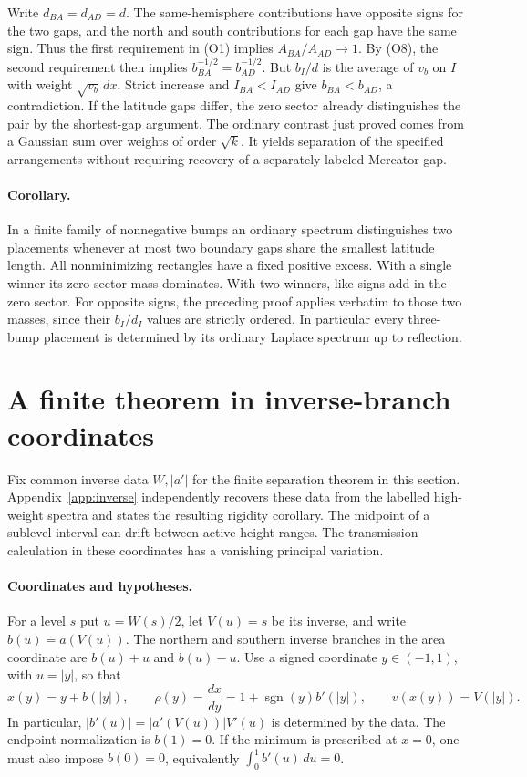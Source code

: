 \documentclass[11pt,letterpaper]{article}
\begin{document}
Write \(d_{BA}=d_{AD}=d\). The same-hemisphere contributions have
opposite signs for the two gaps, and the north and south contributions
for each gap have the same sign. Thus the first requirement in (O1)
implies \(A_{BA}/A_{AD}\to1\). By (O8), the second requirement then
implies \(b_{BA}^{-1/2}=b_{AD}^{-1/2}\). But \(b_I/d\) is the average
of \(v_b\) on \(I\) with weight \(\sqrt{v_b}\,dx\).
Strict increase and \(I_{BA}<I_{AD}\) give \(b_{BA}<b_{AD}\), a
contradiction. If the latitude gaps differ, the zero sector already
distinguishes the pair by the shortest-gap argument. The ordinary
contrast just proved comes from a Gaussian sum over weights of order
\(\sqrt k\). It yields separation of the specified arrangements without
requiring recovery of a separately labeled Mercator gap.

\paragraph{Corollary.}
In a finite family of nonnegative bumps an ordinary spectrum distinguishes
two placements whenever at most two boundary gaps share the smallest
latitude length. All nonminimizing rectangles have a fixed positive excess.
With a single winner its zero-sector mass dominates. With two winners,
like signs add in the zero sector. For opposite signs, the preceding proof
applies verbatim to those two masses, since their \(b_I/d_I\) values are
strictly ordered. In particular every three-bump placement is determined
by its ordinary Laplace spectrum up to reflection.

\section{A finite theorem in inverse-branch coordinates}

Fix common inverse data \(W,|a'|\) for the finite separation theorem
in this section. Appendix~\ref{app:inverse} independently recovers
these data from the labelled high-weight spectra and states the resulting
rigidity corollary. The midpoint of a sublevel interval can drift between
active height ranges. The transmission calculation in these coordinates
has a vanishing principal variation.

\paragraph{Coordinates and hypotheses.}
For a level $s$ put $u=W(s)/2$, let $V(u)=s$ be its inverse, and write $b(u)=a(V(u))$. The northern and southern inverse branches in the area coordinate are $b(u)+u$ and $b(u)-u$. Use a signed coordinate $y\in(-1,1)$, with $u=|y|$, so that
\[
 x(y)=y+b(|y|),\qquad
 \rho(y)=\frac{dx}{dy}=1+\operatorname{sgn}(y)b'(|y|),\qquad
 v(x(y))=V(|y|).
\]
In particular, $|b'(u)|=|a'(V(u))|V'(u)$ is determined by the data. The endpoint normalization is $b(1)=0$. If the minimum is prescribed at $x=0$, one must also impose $b(0)=0$, equivalently $\int_0^1 b'(u)\,du=0$.
\end{document}
